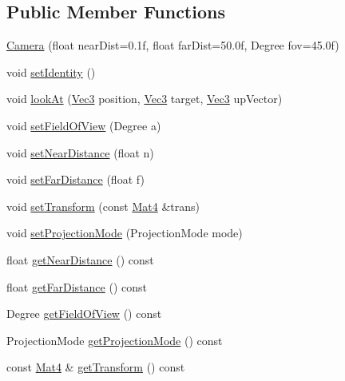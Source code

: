 \subsection*{\-Public \-Member \-Functions}
\begin{DoxyCompactItemize}
\item 
\hyperlink{class_verdi_1_1_camera_a068216872eaeff448e80b0f11b14fbb6}{\-Camera} (float near\-Dist=0.\-1f, float far\-Dist=50.\-0f, Degree fov=45.\-0f)
\item 
void \hyperlink{class_verdi_1_1_camera_afa0ed5b444cbfa05d969660c39157e80}{set\-Identity} ()
\item 
void \hyperlink{class_verdi_1_1_camera_a2a1850a1121ac9bc930b53c57757d576}{look\-At} (\hyperlink{class_verdi_1_1_vec3}{\-Vec3} position, \hyperlink{class_verdi_1_1_vec3}{\-Vec3} target, \hyperlink{class_verdi_1_1_vec3}{\-Vec3} up\-Vector)
\item 
void \hyperlink{class_verdi_1_1_camera_af95b47b152ea0a38539ecd316e4a3168}{set\-Field\-Of\-View} (\-Degree a)
\item 
void \hyperlink{class_verdi_1_1_camera_adf74fa36e0cd043cddb3d55c70cb2e35}{set\-Near\-Distance} (float n)
\item 
void \hyperlink{class_verdi_1_1_camera_ac8deda427400e4cb6b202360feb5c61c}{set\-Far\-Distance} (float f)
\item 
void \hyperlink{class_verdi_1_1_camera_a641bbd66efdc42992f0170860dd5c42b}{set\-Transform} (const \hyperlink{class_verdi_1_1_mat4}{\-Mat4} \&trans)
\item 
void \hyperlink{class_verdi_1_1_camera_a8d44e993fc86dd3e8c0c6e37767a36c0}{set\-Projection\-Mode} (\-Projection\-Mode mode)
\item 
float \hyperlink{class_verdi_1_1_camera_a0dc7399cefc3aca14b78120c1520c64d}{get\-Near\-Distance} () const 
\item 
float \hyperlink{class_verdi_1_1_camera_a140a56ef7ac0e05d5c916a681a1dbb9c}{get\-Far\-Distance} () const 
\item 
\-Degree \hyperlink{class_verdi_1_1_camera_a28c1e94db8ff12e697261ad914e99741}{get\-Field\-Of\-View} () const 
\item 
\-Projection\-Mode \hyperlink{class_verdi_1_1_camera_ab825b5e0c83c8481b2c99a5c4e4d17c6}{get\-Projection\-Mode} () const 
\item 
const \hyperlink{class_verdi_1_1_mat4}{\-Mat4} \& \hyperlink{class_verdi_1_1_camera_a735480943d90de3a433be2a828331477}{get\-Transform} () const 
\end{DoxyCompactItemize}
